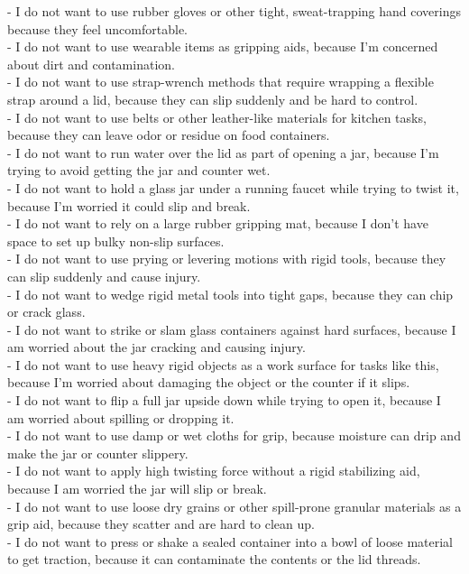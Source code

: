 \begin{tcolorbox}
- I do not want to use rubber gloves or other tight, sweat-trapping hand coverings because they feel uncomfortable.\\
- I do not want to use wearable items as gripping aids, because I’m concerned about dirt and contamination.\\
- I do not want to use strap-wrench methods that require wrapping a flexible strap around a lid, because they can slip suddenly and be hard to control.\\
- I do not want to use belts or other leather-like materials for kitchen tasks, because they can leave odor or residue on food containers.\\
- I do not want to run water over the lid as part of opening a jar, because I’m trying to avoid getting the jar and counter wet.\\
- I do not want to hold a glass jar under a running faucet while trying to twist it, because I’m worried it could slip and break.\\
- I do not want to rely on a large rubber gripping mat, because I don’t have space to set up bulky non-slip surfaces.\\
- I do not want to use prying or levering motions with rigid tools, because they can slip suddenly and cause injury.\\
- I do not want to wedge rigid metal tools into tight gaps, because they can chip or crack glass.\\
- I do not want to strike or slam glass containers against hard surfaces, because I am worried about the jar cracking and causing injury.\\
- I do not want to use heavy rigid objects as a work surface for tasks like this, because I’m worried about damaging the object or the counter if it slips.\\
- I do not want to flip a full jar upside down while trying to open it, because I am worried about spilling or dropping it.\\
- I do not want to use damp or wet cloths for grip, because moisture can drip and make the jar or counter slippery.\\
- I do not want to apply high twisting force without a rigid stabilizing aid, because I am worried the jar will slip or break.\\
- I do not want to use loose dry grains or other spill-prone granular materials as a grip aid, because they scatter and are hard to clean up.\\
- I do not want to press or shake a sealed container into a bowl of loose material to get traction, because it can contaminate the contents or the lid threads.\\

\end{tcolorbox}

